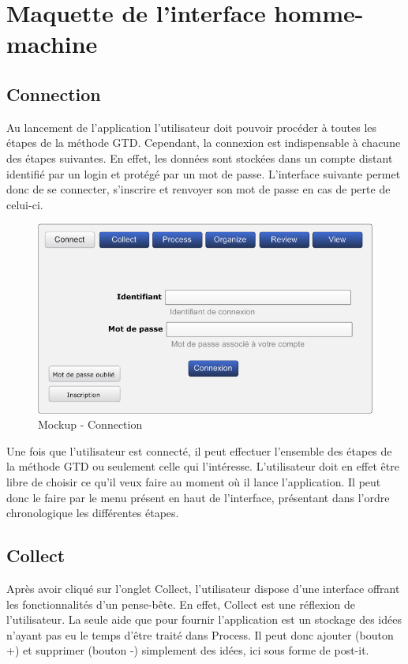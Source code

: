 \chapter{Maquette de l'interface homme-machine}

\section{Connection}
Au lancement de l'application l'utilisateur doit pouvoir procéder à toutes les
étapes de la méthode GTD. Cependant, la connexion est indispensable à chacune
des étapes suivantes. En effet, les données sont stockées dans un compte
distant identifié par un login et protégé par un mot de passe. L'interface
suivante permet donc de se connecter, s'inscrire et renvoyer son mot de passe
en cas de perte de celui-ci.

\begin{figure}[H]
  \begin{center}
  \includegraphics[scale=0.5]{livrable2/images/connect.png}
  \caption{Mockup - Connection}
  \end{center}
\end{figure}

Une fois que l'utilisateur est connecté, il peut effectuer l'ensemble des
étapes de la méthode GTD ou seulement celle qui l'intéresse. L'utilisateur doit
en effet être libre de choisir ce qu'il veux faire au moment où il lance
l'application. Il peut donc le faire par le menu présent en haut de
l'interface, présentant dans l'ordre chronologique les différentes étapes.

\section{Collect}
Après avoir cliqué sur l'onglet Collect, l'utilisateur dispose d'une interface offrant
les fonctionnalités d'un pense-bête. En effet, Collect est une réflexion de
l'utilisateur. La seule aide que pour fournir l'application est un stockage des
idées n'ayant pas eu le temps d'être traité dans Process. Il peut donc ajouter (bouton +) et supprimer (bouton -) simplement des idées, ici sous forme de
post-it.


